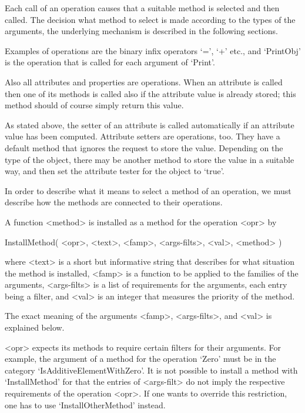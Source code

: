 
Each call of an operation causes that a suitable method is selected
and then called.
The decision what method to select is made according to the types
of the arguments,
the underlying mechanism is described in the following sections.

Examples of operations are the binary infix operators `=', `+' etc.,
and `PrintObj' is the operation that is called for each argument of
`Print'.


Also all attributes and properties are operations.
When an attribute is called then one of its methods is called
also if the attribute value is already stored;
this method should of course simply return this value.

As stated above, the setter of an attribute is called automatically
if an attribute value has been computed.
Attribute setters are operations, too.
They have a default method that ignores the request to store the value.
Depending on the type of the object,
there may be another method to store the value in a suitable way,
and then set the attribute tester for the object to `true'.



In order to describe what it means to select a method of an operation,
we must describe how the methods are connected to their operations.

A function <method> is installed as a method for the operation <opr> by

\>InstallMethod( <opr>, <text>, <famp>, <args-filts>, <val>, <method> )

where <text> is a short but informative string that describes for what
situation the method is installed,
<famp> is a function to be applied to the families of the arguments,
<args-filts> is a list of requirements for the arguments,
each entry being a filter,
and <val> is an integer that measures the priority of the method.

The exact meaning of the arguments <famp>, <args-filts>, and <val>
is explained below.

<opr> expects its methods to require certain filters for their arguments.
For example, the argument of a method for the operation `Zero' must be
in the category `IsAdditiveElementWithZero'.
It is not possible to install a method with `InstallMethod' for that the
entries of <args-filt> do not imply the respective requirements of the
operation <opr>.
If one wants to override this restriction,
one has to use `InstallOtherMethod' instead.


